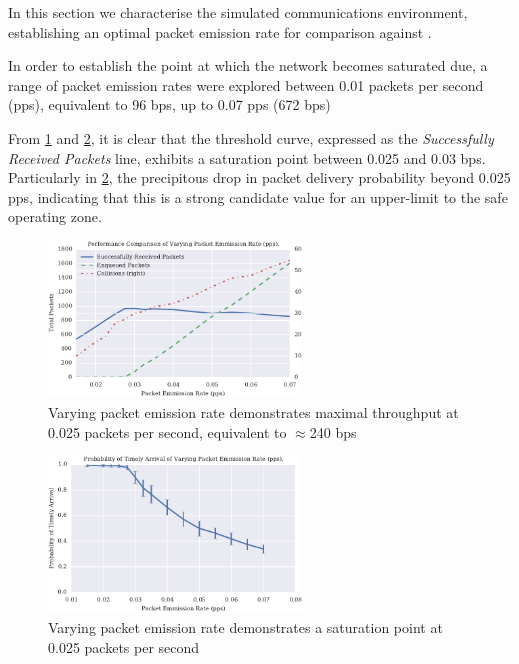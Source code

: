 \documentclass[runningheads,a4paper]{llncs}
\begin{document}
In this section we characterise the simulated communications environment, establishing an optimal packet emission rate for comparison against \cite{Guo11}.

In order to establish the point at which the network becomes saturated due, a range of packet emission rates were explored between 0.01 packets per second (pps), equivalent to 96 bps, up to 0.07 pps (672 bps)

From \ref{fig:throughput_performance_static} and \ref{fig:prod_breakdown_static}, it is clear that the threshold curve, expressed as the \emph{Successfully Received Packets} line, exhibits a saturation point between 0.025 and 0.03 bps.
Particularly in \ref{fig:prod_breakdown_static}, the precipitous drop in packet delivery probability beyond 0.025 pps, indicating that this is a strong candidate value for an upper-limit to the safe operating zone.

\begin{figure}[H]
  \centering
  \includegraphics[width=0.6\textwidth]{img/throughput_performance_static.pdf}
  \caption{Varying packet emission rate demonstrates maximal throughput at 0.025 packets per second, equivalent to $\approx$240 bps}
  \label{fig:throughput_performance_static}
\end{figure}


\begin{figure}[H]
  \centering
  \includegraphics[width=0.6\textwidth]{img/prod_breakdown_static.pdf}
  \caption{Varying packet emission rate demonstrates a saturation point at 0.025 packets per second}
  \label{fig:prod_breakdown_static}
\end{figure}
\end{document}
